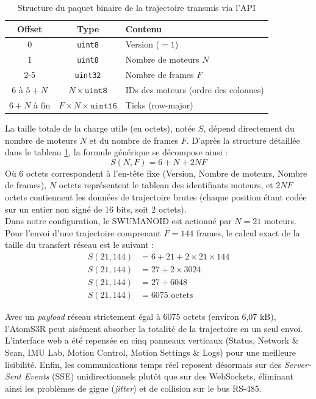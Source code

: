 \documentclass{tropLaClasse}
\begin{document}
\begin{table}[h]
\centering
\begin{tabular}{|c|c|l|}
\hline
\textbf{Offset} & \textbf{Type} & \textbf{Contenu} \\ \hline
0 & \texttt{uint8} & Version ($=1$) \\ \hline
1 & \texttt{uint8} & Nombre de moteurs $N$ \\ \hline
2-5 & \texttt{uint32} & Nombre de frames $F$ \\ \hline
6 à $5+N$ & $N \times \texttt{uint8}$ & IDs des moteurs (ordre des colonnes) \\ \hline
$6+N$ à fin & $F \times N \times \texttt{uint16}$ & Ticks (row-major) \\ \hline
\end{tabular}
\caption{Structure du paquet binaire de la trajectoire transmis via l'API}
\label{tab:binary_payload}
\end{table}

La taille totale de la charge utile (en octets), notée $S$, dépend directement du nombre de moteurs $N$ et du nombre de frames $F$. D'après la structure détaillée dans le tableau \ref{tab:binary_payload}, la formule générique se décompose ainsi :
\begin{equation}
S(N, F) = 6 + N + 2NF
\end{equation}
Où $6$ octets correspondent à l'en-tête fixe (Version, Nombre de moteurs, Nombre de frames), $N$ octets représentent le tableau des identifiants moteurs, et $2NF$ octets contiennent les données de trajectoire brutes (chaque position étant codée sur un entier non signé de 16 bits, soit 2 octets).\\

Dans notre configuration, le SWUMANOID est actionné par $N = 21$ moteurs. Pour l'envoi d'une trajectoire comprenant $F = 144$ frames, le calcul exact de la taille du transfert réseau est le suivant :
\begin{align*}
S(21, 144) &= 6 + 21 + 2 \times 21 \times 144 \\
S(21, 144) &= 27 + 2 \times 3024 \\
S(21, 144) &= 27 + 6048 \\
S(21, 144) &= 6075 \text{ octets}
\end{align*}

Avec un \textit{payload} réseau strictement égal à 6075 octets (environ 6,07 kB), l'AtomS3R peut aisément absorber la totalité de la trajectoire en un seul envoi. L'interface web a été repensée en cinq panneaux verticaux (Status, Network \& Scan, IMU Lab, Motion Control, Motion Settings \& Logs) pour une meilleure lisibilité. Enfin, les communications temps réel reposent désormais sur des \textit{Server-Sent Events} (SSE) unidirectionnels plutôt que sur des WebSockets, éliminant ainsi les problèmes de gigue (\textit{jitter}) et de collision sur le bus RS-485.
\end{document}
